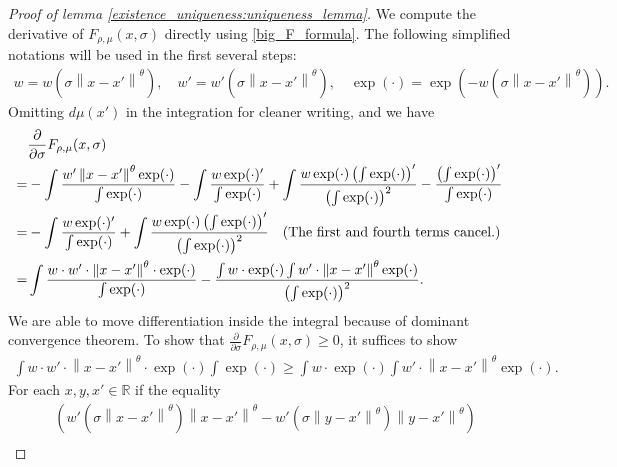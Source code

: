 \documentclass[10pt]{article}
\newcommand{\norm}[1]{\left\lVert#1\right\rVert}
\newenvironment{Proof of lemma}{\noindent{\bf Proof of Lemma}}{\hfill$\Box$\newline}
\newenvironment{Proof of claim}{\noindent{\bf Proof of claim}}{\hfill$\Box$\newline}
\newenvironment{Proof of theorem}{\noindent{\bf Proof of Theorem}}{\hfill\scriptsize{$\Box$}\newline}
\newenvironment{Proof of theorems}{\noindent{\bf Proof of Theorems}}{\hfill$\Box$\newline}
\newenvironment{Proof of proposition}{\noindent{\bf Proof of Proposition}}{\hfill$\Box$\newline}
\newenvironment{Proof of propositions}{\noindent{\bf Proof of Propositions}}{\hfill$\Box$\newline}
\newenvironment{Proof of exercise}{\noindent{\it Proof of Exercise:}}{\hfill$\Box$}
\numberwithin{equation}{section}
\begin{document}
\begin{proof}[Proof of lemma \ref{existence_uniqueness:uniqueness_lemma}]
    We compute the derivative of $F_{\rho,\mu}(x,\sigma)$ directly using \eqref{big_F_formula}. The following simplified
    notations will be used in the first several steps:
    \begin{align}
        w = w(\sigma\norm{x-x'}^{\theta}), \quad w'=w'(\sigma\norm{x-x'}^{\theta}), \quad \exp(\cdot) = \exp(-w(\sigma\norm{x-x'}^{\theta})).
    \end{align}
    Omitting $d\mu(x')$ in the integration for cleaner writing, and we have
    \begin{align}
          & \frac{\partial}{\partial \sigma} F_{\rho,\mu}(x,\sigma) \nonumber                                                                                                                                    \\
        = & -\int \frac{w'\norm{x-x'}^{\theta}\exp(\cdot)}{\int \exp(\cdot)} -\int \frac{w\exp(\cdot)'}{\int \exp(\cdot)} +
        \int \frac{w \exp(\cdot) \left(\int \exp(\cdot)\right)'}{\left(\int \exp(\cdot)\right)^2} - \frac{\left(\int \exp(\cdot)\right)'}{\int \exp(\cdot)} \nonumber                                            \\
        = & -\int \frac{w\exp(\cdot)'}{\int \exp(\cdot)} +
        \int \frac{w \exp(\cdot) \left(\int \exp(\cdot)\right)'}{\left(\int \exp(\cdot)\right)^2} \quad \text{\normalfont (The first and fourth terms cancel.)} \nonumber                                        \\
        = & \int \frac{w\cdot w' \cdot \norm{x-x'}^{\theta} \cdot \exp(\cdot)}{\int \exp(\cdot)}-\frac{\int w \cdot \exp(\cdot) \int w'\cdot \norm{x-x'}^{\theta} \exp(\cdot)}{\left(\int \exp(\cdot)\right)^2}.
    \end{align}
    We are able to move differentiation inside the integral because of dominant convergence theorem. To show that $\frac{\partial}{\partial \sigma} F_{\rho,\mu}(x,\sigma) \geq 0$, it suffices to show
    \begin{align} \label{monotone_inequ}
        \int w\cdot w' \cdot \norm{x-x'}^{\theta} \cdot \exp(\cdot) \int \exp(\cdot) \geq \int w \cdot \exp(\cdot) \int w'\cdot \norm{x-x'}^{\theta} \exp(\cdot).
    \end{align}
    For each $x,y,x' \in \mathbb{R}$ if the equality
    \begin{align} \label{monotone_condition}
         & (w'(\sigma\norm{x-x'}^{\theta})\norm{x-x'}^{\theta}-w'(\sigma\norm{y-x'}^{\theta})\norm{y-x'}^{\theta}) \nonumber                                   \\

\end{align}
\end{proof}
\end{document}
